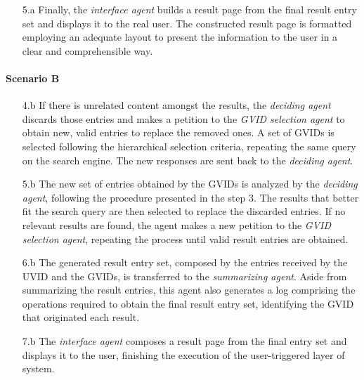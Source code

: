 \begin{enumerate}
\begin{enumerate}
        \item [5.a] Finally, the \textit{interface agent} builds a result page from the final result entry set and displays it to the real user. The constructed result page is formatted employing an adequate layout to present the information to the user in a clear and comprehensible way.
    \end{enumerate}
    
    \paragraph{Scenario B}
    \begin{enumerate}
        \item [4.b] If there is unrelated content amongst the results, the \textit{deciding agent} discards those entries and makes a petition to the \textit{GVID selection agent} to obtain new, valid entries to replace the removed ones. A set of GVIDs is selected following the hierarchical selection criteria, repeating the same query on the search engine. The new responses are sent back to the \textit{deciding agent}.
        
        \item[5.b] The new set of entries obtained by the GVIDs is analyzed by the \textit{deciding agent}, following the procedure presented in the step 3. The results that better fit the search query are then selected to replace the discarded entries. If no relevant results are found, the agent makes a new petition to the \textit{GVID selection agent}, repeating the process until valid result entries are obtained.
        
        \item [6.b] The generated result entry set, composed by the entries received by the UVID and the GVIDs, is transferred to the \textit{summarizing agent}. Aside from summarizing the result entries, this agent also generates a log comprising the operations required to obtain the final result entry set, identifying the GVID that originated each result.
        
        \item [7.b] The \textit{interface agent} composes a result page from the final entry set and displays it to the user, finishing the execution of the user-triggered layer of system.
    \end{enumerate}
\end{enumerate}

